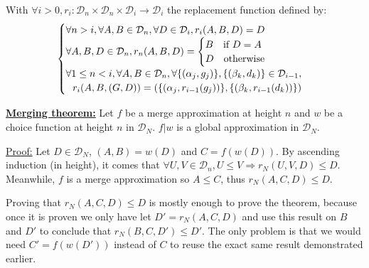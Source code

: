 With $\forall i > 0, r_i : \mathcal{D}_n \times \mathcal{D}_n \times \mathcal{D}_i \rightarrow \mathcal{D}_i$ the replacement function defined by:
$$\begin{cases}
\forall n > i, \forall A, B \in \mathcal{D}_n, \forall D \in \mathcal{D}_i, r_i(A, B, D) = D \\
\forall A, B, D \in \mathcal{D}_n, r_n(A, B, D) = \begin{cases}
B \quad \text{if}~D = A \\
D \quad \text{otherwise}
\end{cases} \\
\forall 1 \le n < i, \forall A, B \in \mathcal{D}_n, \forall \{(\alpha_j, g_j)\}, \{(\beta_k, d_k)\} \in \mathcal{D}_{i-1},\\
\hfill r_i(A, B, (G, D)) = (\{(\alpha_j, r_{i-1}(g_j))\}, \{(\beta_k, r_{i-1}(d_k))\})
\end{cases}
$$

\noindent\underline{\textbf{Merging theorem:}} Let $f$ be a merge approximation at height $n$ and $w$ be a choice function at height $n$ in $\mathcal{D}_N$. $f|w$ is a global approximation in $\mathcal{D}_N$.

\noindent\underline{Proof:} Let $D \in \mathcal{D}_N$, $(A, B) = w(D)$ and $C = f(w(D))$. By ascending induction (in height), it comes that $\forall U, V \in \mathcal{D}_n, U \le V \Rightarrow r_N(U, V, D) \le D$. Meanwhile, $f$ is a merge approximation so $A \le C$, thus $r_N(A, C, D) \le D$.

Proving that $r_N(A, C, D) \le D$ is mostly enough to prove the theorem, because once it is proven we only have let $D' = r_N(A, C, D)$ and use this result on $B$ and $D'$ to conclude that $r_N(B, C, D') \le D'$. The only problem is that we would need $C' = f(w(D'))$ instead of $C$ to reuse the exact same result demonstrated earlier.
\hfill{} $\boxed{}$
